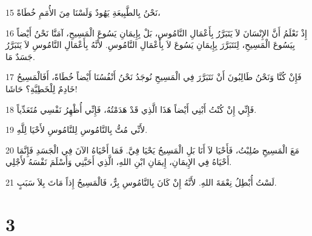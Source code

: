 \par 15 نَحْنُ بِالطَّبِيعَةِ يَهُودٌ وَلَسْنَا مِنَ الأُمَمِ خُطَاةً،
\par 16 إِذْ نَعْلَمُ أَنَّ الإِنْسَانَ لاَ يَتَبَرَّرُ بِأَعْمَالِ النَّامُوسِ، بَلْ بِإِيمَانِ يَسُوعَ الْمَسِيحِ، آمَنَّا نَحْنُ أَيْضاً بِيَسُوعَ الْمَسِيحِ، لِنَتَبَرَّرَ بِإِيمَانِ يَسُوعَ لاَ بِأَعْمَالِ النَّامُوسِ. لأَنَّهُ بِأَعْمَالِ النَّامُوسِ لاَ يَتَبَرَّرُ جَسَدٌ مَا.
\par 17 فَإِنْ كُنَّا وَنَحْنُ طَالِبُونَ أَنْ نَتَبَرَّرَ فِي الْمَسِيحِ نُوجَدُ نَحْنُ أَنْفُسُنَا أَيْضاً خُطَاةً، أَفَالْمَسِيحُ خَادِمٌ لِلْخَطِيَّةِ؟ حَاشَا!
\par 18 فَإِنِّي إِنْ كُنْتُ أَبْنِي أَيْضاً هَذَا الَّذِي قَدْ هَدَمْتُهُ، فَإِنِّي أُظْهِرُ نَفْسِي مُتَعَدِّياً.
\par 19 لأَنِّي مُتُّ بِالنَّامُوسِ لِلنَّامُوسِ لأَحْيَا لِلَّهِ.
\par 20 مَعَ الْمَسِيحِ صُلِبْتُ، فَأَحْيَا لاَ أَنَا بَلِ الْمَسِيحُ يَحْيَا فِيَّ. فَمَا أَحْيَاهُ الآنَ فِي الْجَسَدِ فَإِنَّمَا أَحْيَاهُ فِي الإِيمَانِ، إِيمَانِ ابْنِ اللهِ، الَّذِي أَحَبَّنِي وَأَسْلَمَ نَفْسَهُ لأَجْلِي.
\par 21 لَسْتُ أُبْطِلُ نِعْمَةَ اللهِ. لأَنَّهُ إِنْ كَانَ بِالنَّامُوسِ بِرٌّ، فَالْمَسِيحُ إِذاً مَاتَ بِلاَ سَبَبٍ.

\chapter{3}

